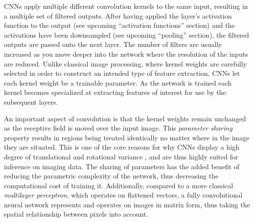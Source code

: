 CNNs apply multiple different convolution kernels to the same input, resulting in a multiple set of filtered outputs.
After having applied the layer's activation function to the output (see upcoming \enquote{activation functions} section) and the activations have been downsampled (see upcoming \enquote{pooling} section), the filtered outputs are passed onto the next layer.
The number of filters are usually increased as you move deeper into the network where the resolution of the inputs are reduced.
Unlike classical image processing, where kernel weights are carefully selected in order to construct an intended type of feature extraction, CNNs let each kernel weight be a trainable parameter.
As the network is trained each kernel becomes specialized at extracting features of interest for use by the subsequent layers.

An important aspect of convolution is that the kernel weights remain unchanged as the receptive field is moved over the input image.
This \textit{parameter sharing} property \cite{visint-cnn} results in regions being treated identically no matter where in the image they are situated.
This is one of the core reasons for why CNNs display a high degree of translational and rotational variance \cite{cnn-translational-invariance}, and are thus highly suited for inference on imaging data.
The sharing of parameters has the added benefit of reducing the parametric complexity of the network, thus decreasing the computational cost of training it.
Additionally, compared to a more classical \textit{multilayer perceptron}, which operates on flattened vectors, a fully convolutional neural network represents and operates on images in matrix form, thus taking the spatial relationship between pixels into account.
